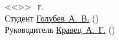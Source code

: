 \documentclass[a4paper, 14pt]{extreport}
\begin{document}
    \pagestyle{empty}
    \vspace{\fill}
    \noindent<<\underline{\hspace{1cm}}>> \underline{\hspace{5cm}} \the\year\ г.\\
    Студент \hspace{1cm} \underline{Голубев~А.~В.\hspace{3.2cm}} \hspace{2cm} (\underline{\hspace{5cm}})\\
    Руководитель \underline{Кравец~А.~Г.\hspace{3.42cm}} \hspace{2cm} (\underline{\hspace{5cm}})\\
\end{document}
